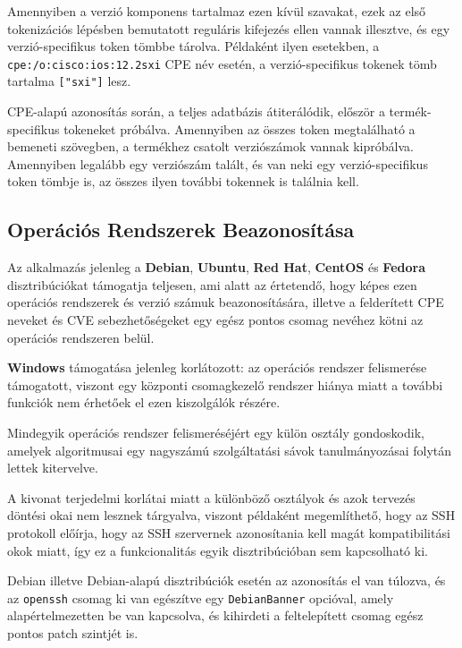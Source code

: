 	Amennyiben a verzió komponens tartalmaz ezen kívül szavakat, ezek az első tokenizációs lépésben bemutatott reguláris kifejezés ellen vannak illesztve, és egy verzió-specifikus token tömbbe tárolva. Példaként ilyen esetekben, a \texttt{cpe:/o:cisco:ios:12.2sxi} CPE név esetén, a verzió-specifikus tokenek tömb tartalma \texttt{["sxi"]} lesz.
	
	CPE-alapú azonosítás során, a teljes adatbázis átiterálódik, először a termék-specifikus tokeneket próbálva. Amennyiben az összes token megtalálható a bemeneti szövegben, a termékhez csatolt verziószámok vannak kipróbálva. Amennyiben legalább egy verziószám talált, és van neki egy verzió-specifikus token tömbje is, az összes ilyen további tokennek is találnia kell.

\subsection*{Operációs Rendszerek Beazonosítása}

	Az alkalmazás jelenleg a \textbf{Debian}, \textbf{Ubuntu}, \textbf{Red Hat}, \textbf{CentOS} és \textbf{Fedora} disztribúciókat támogatja teljesen, ami alatt az értetendő, hogy képes ezen operációs rendszerek és verzió számuk beazonosítására, illetve a felderített CPE neveket és CVE sebezhetőségeket egy egész pontos csomag nevéhez kötni az operációs rendszeren belül.
	
	\textbf{Windows} támogatása jelenleg korlátozott: az operációs rendszer felismerése támogatott, viszont egy központi csomagkezelő rendszer hiánya miatt a további funkciók nem érhetőek el ezen kiszolgálók részére.
	
	Mindegyik operációs rendszer felismeréséjért egy külön osztály gondoskodik, amelyek algoritmusai egy nagyszámú szolgáltatási sávok tanulmányozásai folytán lettek kitervelve.
	
	A kivonat terjedelmi korlátai miatt a különböző osztályok és azok tervezés döntési okai nem lesznek tárgyalva, viszont példaként megemlíthető, hogy az SSH protokoll előírja, hogy az SSH szervernek azonosítania kell magát kompatibilitási okok miatt, így ez a funkcionalitás egyik disztribúcióban sem kapcsolható ki.
	
	Debian illetve Debian-alapú disztribúciók esetén az azonosítás el van túlozva, és az \texttt{openssh} csomag ki van egészítve egy \texttt{DebianBanner} opcióval, amely alapértelmezetten be van kapcsolva, és kihirdeti a feltelepített csomag egész pontos patch szintjét is.
	
